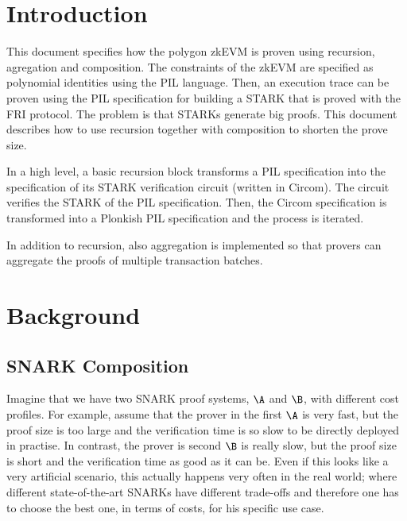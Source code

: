 
\section{Introduction}

This document specifies how the polygon zkEVM is proven using 
recursion, agregation and composition.
The constraints of the zkEVM are specified as polynomial identities using the 
PIL language. Then, an execution trace can be proven using the PIL specification for 
building a STARK that is proved with the FRI protocol.
The problem is that STARKs generate big proofs. 
This document describes how to use recursion together with composition to shorten the prove size.

In a high level, a basic recursion block transforms a PIL specification into the 
specification of its STARK verification circuit (written in Circom). 
The circuit verifies the STARK of the PIL specification. 
Then, the Circom specification is transformed into a Plonkish PIL specification and the process is iterated.

In addition to recursion, also aggregation is implemented so that provers 
can aggregate the proofs of multiple transaction batches. 


\ifBACKGROUND
\section{Background}

\subsection{SNARK Composition} \label{sec:composition}

Imagine that we have two SNARK proof systems, $\A$ and $\B$, with different cost profiles. For example, assume that the prover in the first $\A$ is very fast, but the proof size is too large and the verification time is so slow to be directly deployed in practise. In contrast, the prover is second $\B$ is really slow, but the proof size is short and the verification time as good as it can be. Even if this looks like a very artificial scenario, this actually happens very often in the real world; where different state-of-the-art SNARKs have different trade-offs and therefore one has to choose the best one, in terms of costs, for his specific use case.


